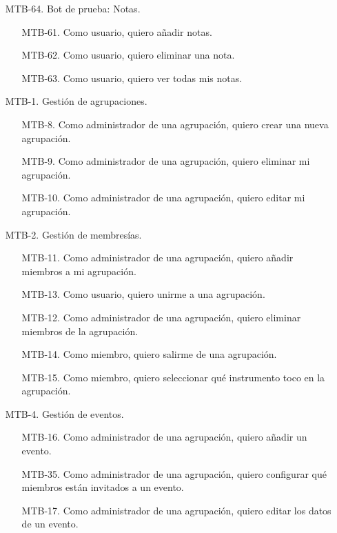 \begin{enumerate}
    \item[MTB-64.] Bot de prueba: Notas.
        \begin{enumerate}
            \item[MTB-61.] Como usuario, quiero añadir notas.
            \item[MTB-62.] Como usuario, quiero eliminar una nota.
            \item[MTB-63.] Como usuario, quiero ver todas mis notas.
        \end{enumerate}
    \item[MTB-1.] Gestión de agrupaciones.
        \begin{enumerate}
            \item[MTB-8.] Como administrador de una agrupación, quiero crear una nueva agrupación.
            \item[MTB-9.] Como administrador de una agrupación, quiero eliminar mi agrupación.
            \item[MTB-10.] Como administrador de una agrupación, quiero editar mi agrupación.
        \end{enumerate}
    \item[MTB-2.] Gestión de membresías.
        \begin{enumerate}
            \item[MTB-11.] Como administrador de una agrupación, quiero añadir miembros a mi agrupación.
            \item[MTB-13.] Como usuario, quiero unirme a una agrupación.
            \item[MTB-12.] Como administrador de una agrupación, quiero eliminar miembros de la agrupación.
            \item[MTB-14.] Como miembro, quiero salirme de una agrupación.
            \item[MTB-15.] Como miembro, quiero seleccionar qué instrumento toco en la agrupación.
        \end{enumerate}
    \item[MTB-4.] Gestión de eventos.
        \begin{enumerate}
            \item[MTB-16.] Como administrador de una agrupación, quiero añadir un evento.
            \item[MTB-35.] Como administrador de una agrupación, quiero configurar qué miembros están invitados a un evento.
            \item[MTB-17.] Como administrador de una agrupación, quiero editar los datos de un evento.

\end{enumerate}
\end{enumerate}
